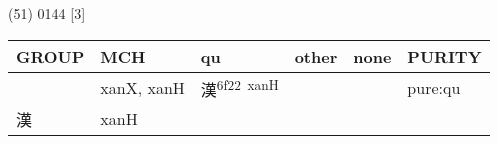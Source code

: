 \documentclass[14pt,a4paper]{scrartcl}
\begin{document}
(51) 0144 {[}3{]}

\begin{longtable}[c]{@{}llllll@{}}
\toprule
\begin{minipage}[b]{0.14\columnwidth}\raggedright\strut
GROUP
\strut\end{minipage} &
\begin{minipage}[b]{0.14\columnwidth}\raggedright\strut
MCH
\strut\end{minipage} &
\begin{minipage}[b]{0.14\columnwidth}\raggedright\strut
qu
\strut\end{minipage} &
\begin{minipage}[b]{0.14\columnwidth}\raggedright\strut
other
\strut\end{minipage} &
\begin{minipage}[b]{0.14\columnwidth}\raggedright\strut
none
\strut\end{minipage} &
\begin{minipage}[b]{0.14\columnwidth}\raggedright\strut
PURITY
\strut\end{minipage}\tabularnewline
\midrule
\endhead
\begin{minipage}[t]{0.14\columnwidth}\raggedright\strut
𩁢
\strut\end{minipage} &
\begin{minipage}[t]{0.14\columnwidth}\raggedright\strut
xanX, xanH
\strut\end{minipage} &
\begin{minipage}[t]{0.14\columnwidth}\raggedright\strut
漢\textsuperscript{6f22~xanH}
\strut\end{minipage} &
\begin{minipage}[t]{0.14\columnwidth}\raggedright\strut
\strut\end{minipage} &
\begin{minipage}[t]{0.14\columnwidth}\raggedright\strut
\strut\end{minipage} &
\begin{minipage}[t]{0.14\columnwidth}\raggedright\strut
pure:qu
\strut\end{minipage}\tabularnewline
\begin{minipage}[t]{0.14\columnwidth}\raggedright\strut
漢
\strut\end{minipage} &
\begin{minipage}[t]{0.14\columnwidth}\raggedright\strut
xanH
\strut\end{minipage} &
\begin{minipage}[t]{0.14\columnwidth}\raggedright\strut

\end{minipage}
\end{longtable}
\end{document}
